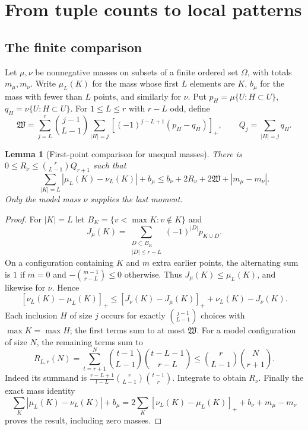 \documentclass[11pt,a4paper]{article}
\newtheorem{lemma}[theorem]{Lemma}
\newcommand{\pp}[1]{\left[#1\right]_+}
\begin{document}
\section[Tuple counts and local patterns]{From tuple counts to local patterns}\label{sec:primeadapter}

\subsection{The finite comparison}

Let $\mu,\nu$ be nonnegative masses on subsets of a finite ordered
set $\Omega$, with totals $m_\mu,m_\nu$. Write $\mu_L(K)$ for
the mass whose first $L$ elements are $K$, $b_\mu$ for the mass
with fewer than $L$ points, and similarly for $\nu$. Put
$p_H=\mu\{U:H\subset U\}$, $q_H=\nu\{U:H\subset U\}$.
For $1\le L\le r$ with $r-L$ odd, define
\[
 \mathfrak W=\sum_{j=L}^r\binom{j-1}{L-1}
          \sum_{|H|=j}\pp{(-1)^{j-L+1}(p_H-q_H)},\qquad
 Q_j=\sum_{|H|=j}q_H.
\]

\begin{lemma}[First-point comparison for unequal masses]\label{lem:stopped}
There is $0\le R_\nu\le\binom r{L-1}Q_{r+1}$ such that
\begin{equation}\label{eq:stopped}
 \sum_{|K|=L}|\mu_L(K)-\nu_L(K)|+b_\mu
       \le b_\nu+2R_\nu+2\mathfrak W+|m_\mu-m_\nu|.
\end{equation}
Only the model mass $\nu$ supplies the last moment.
\end{lemma}
\begin{proof}
For $|K|=L$ let $B_K=\{v<\max K:v\notin K\}$ and
\[
 J_\mu(K)=\sum_{\substack{D\subset B_K\\|D|\le r-L}}
                         (-1)^{|D|}p_{K\cup D}.
\]
On a configuration containing $K$ and $m$ extra earlier points,
the alternating sum is $1$ if $m=0$ and
$-\binom{m-1}{r-L}\le0$ otherwise. Thus $J_\mu(K)\le\mu_L(K)$,
and likewise for $\nu$. Hence
\[
 [\nu_L(K)-\mu_L(K)]_+
       \le[J_\nu(K)-J_\mu(K)]_++\nu_L(K)-J_\nu(K).
\]
Each inclusion $H$ of size $j$ occurs for exactly
$\binom{j-1}{L-1}$ choices with $\max K=\max H$; the first
terms sum to at most $\mathfrak W$. For a model configuration of size $N$,
the remaining terms sum to
\[
 R_{L,r}(N)=\sum_{t=r+1}^N\binom{t-1}{L-1}\binom{t-L-1}{r-L}
           \le\binom r{L-1}\binom N{r+1}.
\]
Indeed its summand is
$\frac{r-L+1}{t-L}\binom r{L-1}\binom{t-1}r$.
Integrate to obtain $R_\nu$. Finally the exact mass identity
\[
 \sum_K|\mu_L(K)-\nu_L(K)|+b_\mu
   =2\sum_K[\nu_L(K)-\mu_L(K)]_++b_\nu+m_\mu-m_\nu
\]
proves the result, including zero masses.
\end{proof}
\end{document}
